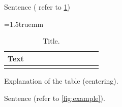 \documentclass[english,fleqn]{ieej-tec2}%
\begin{document}
Sentence ( refer to \tablename\ref{tab:nidanfloat:example})

\begin{table}[t]
\centering
\caption{Title.}
\label{tab:nidanfloat:example}
\tabcolsep=1.5truemm
\begin{tabular}{|c|c|c|c|c|c|c|c|c|c|c|}\hline
Text & \hspace{4zw} &  \hspace{4zw} &  \hspace{4zw} &  \hspace{4zw} &  \hspace{4zw} &  \hspace{4zw} &  \hspace{4zw} &  \hspace{4zw} &  \hspace{4zw} &  \hspace{4zw} \\\hline
& & & & & & & & & & \\\hline
\end{tabular}
\par
\begin{minipage}{\hsize}
\scriptsize\centering%
Explanation of the table (centering).
\end{minipage}
\end{table}

Sentence (refer to \figurename\ref{fig:example}).
\end{document}
